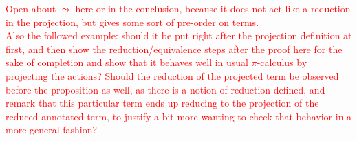 \textcolor{red}{Open about $\leadsto$ here or in the conclusion, because it does not act like a reduction in the projection, but gives some sort of pre-order on terms.\\
Also the followed example: should it be put right after the projection definition at first, and then show the reduction/equivalence steps after the proof here for the sake of completion and show that it behaves well in usual $\pi$-calculus by projecting the actions? Should the reduction of the projected term be observed before the proposition as well, as there is a notion of reduction defined, and remark that this particular term ends up reducing to the projection of the reduced annotated term, to justify a bit more wanting to check that behavior in a more general fashion?} %